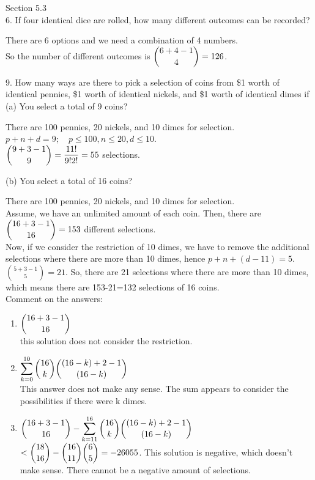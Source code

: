 \documentclass[12pt]{article}
\begin{document}
Section 5.3 \\
6. If four identical dice are rolled, how many different outcomes can 
be recorded?    
\begin{solution}
    There are 6 options and we need a combination of 4 numbers. \\
    So the number of different outcomes is $\dbinom{6+4-1}{4}=126$. 
\end{solution}
9. How many ways are there to pick a selection of coins from \$1 worth 
of identical pennies, \$1 worth of identical nickels, and \$1 worth of 
identical dimes if\\
(a) You select a total of 9 coins?
\begin{solution}
    There are 100 pennies, 20 nickels, and 10 dimes for selection. \\
    $p + n + d = 9; \quad p\le100, n\le20, d\le10$. \\
    $\dbinom{9+3-1}{9} = \dfrac{11!}{9!2!} = 55$ selections.
\end{solution}
(b) You select a total of 16 coins?
\begin{solution}
    There are 100 pennies, 20 nickels, and 10 dimes for selection. \\
    Assume, we have an unlimited amount of each coin. Then, there are 
    $\dbinom{16+3-1}{16}=153$ different selections.\\
    Now, if we consider the restriction of 10 dimes, we have to remove 
    the additional selections where there are more than 10 dimes, hence
    $p + n + (d-11) = 5$. $\binom{5+3-1}{5}=21$. So, there are 21 
    selections where there are more than 10 dimes, which means there 
    are 153-21=132 selections of 16 coins. \\

    Comment on the answers: 
    \begin{enumerate}[label=(\alph*)]
        \item $\dbinom{16+3-1}{16}$\\
        this solution does not consider the restriction. 
        \item $\displaystyle \sum_{k=0}^{10}\dbinom{16}{k}
        \dbinom{(16-k)+2-1}{(16-k)}$\\   
        This answer does not make any sense. The sum appears to consider
        the possibilities if there were k dimes. 
        \item $\dbinom{16+3-1}{16}-\displaystyle\sum_{k=11}^{16}
        \dbinom{16}{k}\dbinom{(16-k)+2-1}{(16-k)}$\\
        $<\dbinom{18}{16} - \dbinom{16}{11}\dbinom{6}{5}=-26055$.
        This solution is negative, which doesn't make sense. There cannot 
        be a negative amount of selections. 
    \end{enumerate}
\end{solution}
\end{document}
